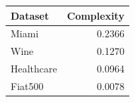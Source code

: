 \begin{tabular}{lr}
\toprule
Dataset & Complexity \\
\midrule
Miami & 0.2366 \\
Wine & 0.1270 \\
Healthcare & 0.0964 \\
Fiat500 & 0.0078 \\
\bottomrule
\end{tabular}

